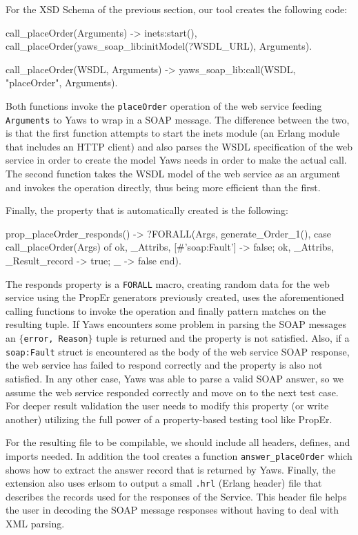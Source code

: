 \documentclass[copyright]{eptcs}
\begin{document}
For the XSD Schema of the previous section, our tool creates the following code:
\begin{lsterlang}[firstnumber=38]
call_placeOrder(Arguments) ->
  inets:start(),
  call_placeOrder(yaws_soap_lib:initModel(?WSDL_URL), Arguments).
    
call_placeOrder(WSDL, Arguments) ->
  yaws_soap_lib:call(WSDL, "placeOrder", Arguments).
\end{lsterlang}
Both functions invoke the \texttt{placeOrder} operation of the
web service feeding \texttt{Arguments} to Yaws to wrap in a SOAP
message. The difference between the two, is that the first function
attempts to start the inets module (an Erlang module that includes an
HTTP client) and also parses the WSDL specification of the web service
in order to create the model Yaws needs in order to make the actual
call. The second function takes the WSDL model of the web service as
an argument and invokes the operation directly, thus being more
efficient than the first.

Finally, the property that is automatically created is the following:
\begin{lsterlang}[firstnumber=46]
prop_placeOrder_responds() ->
  ?FORALL(Args, generate_Order_1(),
           case call_placeOrder(Args) of 
             {ok, _Attribs, [#'soap:Fault'{}]} -> false;
             {ok, _Attribs, _Result_record} -> true;
             _ -> false
           end).
\end{lsterlang}

The responds property is a \texttt{FORALL} macro, creating random data
for the web service using the PropEr generators previously created,
uses the aforementioned calling functions to invoke the operation and
finally pattern matches on the resulting tuple. If Yaws encounters
some problem in parsing the SOAP messages an \texttt{$\{$error,
  Reason$\}$} tuple is returned and the property is not satisfied. Also,
if a \texttt{soap:Fault} struct is encountered as the body of the web
service SOAP response, the web service has failed to respond correctly
and the property is also not satisfied. In any other case, Yaws was
able to parse a valid SOAP answer, so we assume the web service
responded correctly and move on to the next test case. For deeper
result validation the user needs to modify this property (or write
another) utilizing the full power of a property-based testing tool
like PropEr.

For the resulting file to be compilable, we should include all
headers, defines, and imports needed. In addition the tool creates a
function \texttt{answer\_placeOrder} which shows how to extract the
answer record that is returned by Yaws. Finally, the extension also
uses erlsom to output a small \texttt{.hrl} (Erlang header) file that
describes the records used for the responses of the Service. This
header file helps the user in decoding the SOAP message responses
without having to deal with XML parsing.
\end{document}
